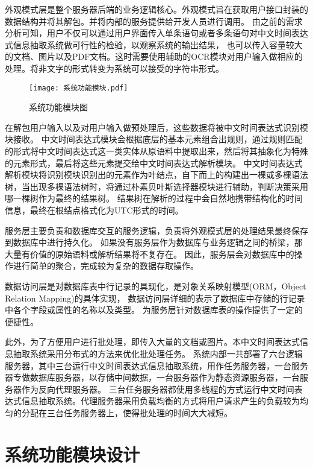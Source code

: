 外观模式层是整个服务器后端的业务逻辑核心。外观模式旨在获取用户接口封装的数据结构并将其解包。并将内部的服务提供给开发人员进行调用。
由之前的需求分析可知，用户不仅可以通过用户界面传入单条语句或者多条语句对中文时间表达式信息抽取系统做可行性的检验，以观察系统的输出结果，
也可以传入容量较大的文档、图片以及PDF文档。这时需要使用辅助的OCR模块对用户输入做相应的处理。将非文字的形式转变为系统可以接受的字符串形式。

\begin{figure}[b]
  \centering
  \texttt{[image: 系统功能模块.pdf]}
  \caption{系统功能模块图}
  \label{fig:system_feature}
\end{figure}

在解包用户输入以及对用户输入做预处理后，这些数据将被中文时间表达式识别模块接收。
中文时间表达式模块会根据底层的基本元素组合出规则，通过规则匹配的形式将中文时间表达式这一类实体从原语料中提取出来，然后将其抽象化为特殊的元素形式，最后将这些元素提交给中文时间表达式解析模块。
中文时间表达式解析模块将识别模块识别出的元素作为叶结点，自下而上的构建出一棵或多棵语法树，当出现多棵语法树时，将通过朴素贝叶斯选择器模块进行辅助，判断决策采用哪一棵树作为最终的结果树。
结果树在解析的过程中会自然地携带结构化的时间信息，最终在根结点格式化为UTC形式的时间。

服务层主要负责和数据库交互的服务逻辑，负责将外观模式层的处理结果最终保存到数据库中进行持久化。
如果没有服务层作为数据库与业务逻辑之间的桥梁，那大量有价值的原始语料或解析结果将不复存在。
因此，服务层会对数据库中的操作进行简单的聚合，完成较为复杂的数据存取操作。

数据访问层是对数据库表中行记录的具现化，是对象关系映射模型(ORM，Object Relation Mapping)的具体实现，
数据访问层详细的表示了数据库中存储的行记录中各个字段或属性的名称以及类型。
为服务层针对数据库表的操作提供了一定的便捷性。

此外，为了方便用户进行批处理，即传入大量的文档或图片。本中文时间表达式信息抽取系统采用分布式的方法来优化批处理任务。
系统内部一共部署了六台逻辑服务器，其中三台运行中文时间表达式信息抽取系统，用作任务服务器，一台服务器专做数据库服务器，以存储中间数据，一台服务器作为静态资源服务器，一台服务器作为反向代理服务器。
三台任务服务器都使用多线程的方式运行中文时间表达式信息抽取系统。代理服务器采用负载均衡的方式将用户请求产生的负载较为均匀的分配在三台任务服务器上，使得批处理的时间大大减短。



\section{系统功能模块设计}

